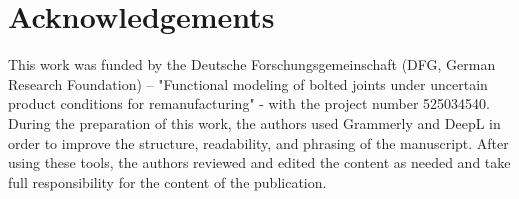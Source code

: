 \documentclass[colorlinks,upint,subscriptcorrection,varvw,hyphenate,balance]{asmeconf}
\begin{document}
\section*{Acknowledgements}
This work was funded by the Deutsche Forschungsgemeinschaft (DFG, German Research Foundation) – "Functional modeling of bolted joints under uncertain product conditions for remanufacturing" - with the project number 525034540. During the preparation of this work, the authors used Grammerly and DeepL in order to improve the structure, readability, and phrasing of the manuscript. After using these tools, the authors reviewed and edited the content as needed and take full responsibility for the content of the publication.


\end{document}
